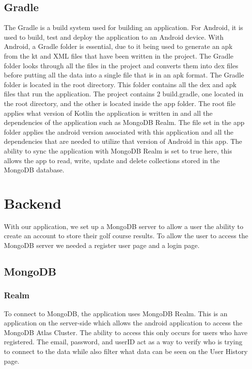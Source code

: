 \subsection{Gradle}
The Gradle is a build system used for building an application. For Android, it is used to build, test and deploy the application to an Android device.
\newline \newline
With Android, a Gradle folder is essential, due to it being used to generate an apk from the kt and XML files that have been written in the project. The Gradle folder looks through all the files in the project and converts them into dex files before putting all the data into a single file that is in an apk format.
\newline \newline
The Gradle folder is located in the root directory. This folder contains all the dex and apk files that run the application. The project contains 2 build.gradle, one located in the root directory, and the other is located inside the app folder. The root file applies what version of Kotlin the application is written in and all the dependencies of the application such as MongoDB Realm. \newline \newline
The file set in the app folder applies the android version associated with this application and all the dependencies that are needed to utilize that version of Android in this app. The ability to sync the application with MongoDB Realm is set to true here, this allows the app to read, write, update and delete collections stored in the MongoDB database.

\section{Backend}
With our application, we set up a MongoDB server to allow a user the ability to create an account to store their golf course results. To allow the user to access the MongoDB server we needed a register user page and a login page.
\subsection{MongoDB}
\subsubsection{Realm}
To connect to MongoDB, the application uses MongoDB Realm. This is an application on the server-side which allows the android application to access the MongoDB Atlas Cluster. The ability to access this only occurs for users who have registered. The email, password, and userID act as a way to verify who is trying to connect to the data while also filter what data can be seen on the User History page.
